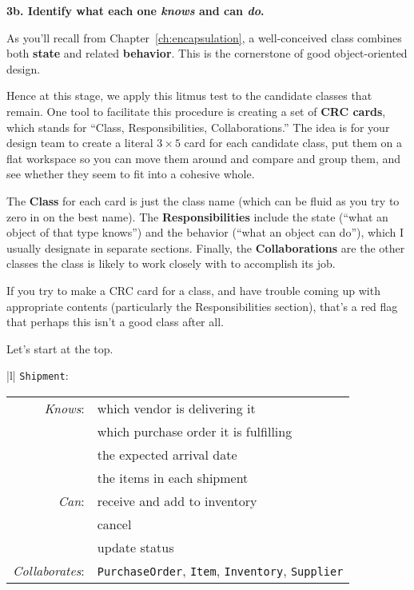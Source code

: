 \vspace{.1in}


\textbf{3b. Identify what each one \textit{knows} and can \textit{do}.}

As you'll recall from Chapter~\ref{ch:encapsulation}, a well-conceived class
combines both \textbf{state} and related \textbf{behavior}. This is the
cornerstone of good object-oriented design.

Hence at this stage, we apply this litmus test to the candidate classes that
remain. One tool to facilitate this procedure is creating a set of \textbf{CRC
cards}, which stands for ``Class, Responsibilities, Collaborations.'' The idea
is for your design team to create a literal $3\times5$ card for each candidate
class, put them on a flat workspace so you can move them around and compare
and group them, and see whether they seem to fit into a cohesive whole.

The \textbf{Class} for each card is just the class name (which can be fluid as
you try to zero in on the best name). The \textbf{Responsibilities} include the
state (``what an object of that type knows'') and the behavior (``what an
object can do''), which I usually designate in separate sections. Finally, the
\textbf{Collaborations} are the other classes the class is likely to work
closely with to accomplish its job.

If you try to make a CRC card for a class, and have trouble coming up with
appropriate contents (particularly the Responsibilities section), that's a red
flag that perhaps this isn't a good class after all.

\pagebreak
\begin{samepage}
Let's start at the top.

\bigskip
\label{bikeCRC1}
\begin{center}
\begin{tabular}{|l|}
\hline
\texttt{Shipment}:\\
\hline
\begin{tabular}{rl}
\textit{Knows}: & which vendor is delivering it\\
& which purchase order it is fulfilling\\
& the expected arrival date\\
& the items in each shipment \\
\textit{Can}: & receive and add to inventory\\
& cancel \\
& update status \\
\hline
\textit{Collaborates}: & \texttt{PurchaseOrder}, \texttt{Item}, \texttt{Inventory}, \texttt{Supplier}\\
\end{tabular}\\
\hline
\end{tabular}
\end{center}
\end{samepage}
\bigskip

